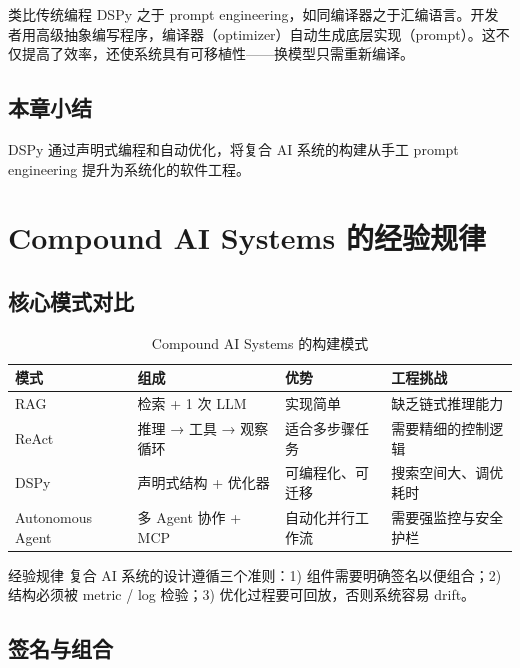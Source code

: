 \documentclass[a4paper]{article}
\begin{document}
\begin{knowledgebox}{类比传统编程}
DSPy 之于 prompt engineering，如同编译器之于汇编语言。开发者用高级抽象编写程序，编译器（optimizer）自动生成底层实现（prompt）。这不仅提高了效率，还使系统具有可移植性——换模型只需重新编译。
\end{knowledgebox}

\subsection{本章小结}

DSPy 通过声明式编程和自动优化，将复合 AI 系统的构建从手工 prompt engineering 提升为系统化的软件工程。

\section{Compound AI Systems 的经验规律}

\subsection{核心模式对比}

\begin{table}[H]
\centering
\caption{Compound AI Systems 的构建模式}
\begin{tabular}{p{}p{}p{}p{}}
\toprule
模式 & 组成 & 优势 & 工程挑战 \\
\midrule
RAG & 检索 + 1 次 LLM & 实现简单 & 缺乏链式推理能力 \\
ReAct & 推理 → 工具 → 观察 循环 & 适合多步骤任务 & 需要精细的控制逻辑 \\
DSPy & 声明式结构 + 优化器 & 可编程化、可迁移 & 搜索空间大、调优耗时 \\
Autonomous Agent & 多 Agent 协作 + MCP & 自动化并行工作流 & 需要强监控与安全护栏 \\
\bottomrule
\end{tabular}
\end{table}

\begin{knowledgebox}{经验规律}
复合 AI 系统的设计遵循三个准则：1) 组件需要明确签名以便组合；2) 结构必须被 metric / log 检验；3) 优化过程要可回放，否则系统容易 drift。
\end{knowledgebox}

\subsection{签名与组合}
\end{document}
